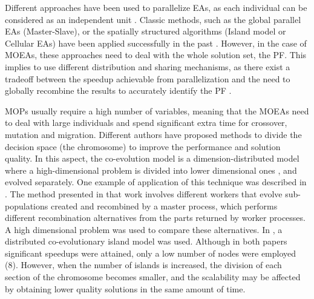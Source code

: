\documentclass[preprint]{elsarticle}
\begin{document}

Different approaches have been used to parallelize EAs, as each individual can be considered as an
independent unit \citep{Alba13parallel}. Classic methods, such as the
global parallel EAs (Master-Slave), or the spatially structured
algorithms (Island model or Cellular EAs) have been applied
successfully in the past \citep{Folino03cellular,Alba02Parallelism}.
However, in the case of MOEAs, these
approaches \citep{Luna15Survey} need to deal with the whole solution set, the PF.
 This implies to use different distribution
and sharing mechanisms, as there exist a tradeoff between the speedup
achievable from parallelization and the need to globally recombine the
results to accurately identify the PF
\citep{Branke04Parallelizingcone}. 

MOPs usually require a high number of variables, meaning that the MOEAs need to deal with large individuals and spend significant extra time for crossover, mutation and migration. Different authors have proposed methods to divide the decision space (the chromosome) to improve the performance and solution quality. In this aspect, the co-evolution model is a dimension-distributed model where a high-dimensional problem is divided into lower dimensional ones \citep{Gong15models,Tonda12cooperative}, and evolved separately. One example of application of this technique was described in \citep{Kimovski15Parallel}. The method presented in that work involves different workers that evolve sub-populations created and recombined by a master process, which performs different recombination alternatives from the parts returned by worker processes. A high dimensional problem was used to compare these
alternatives. In \citep{Dorronsoro13superlinear}, a distributed
co-evolutionary island model was used.  Although in both papers
significant speedups were attained, only a low number of nodes were
employed (8). However, when the number of islands is increased, the division
of each section of the chromosome becomes smaller, and the scalability
may be affected by obtaining lower quality solutions in the same
amount of time. 





\end{document}
